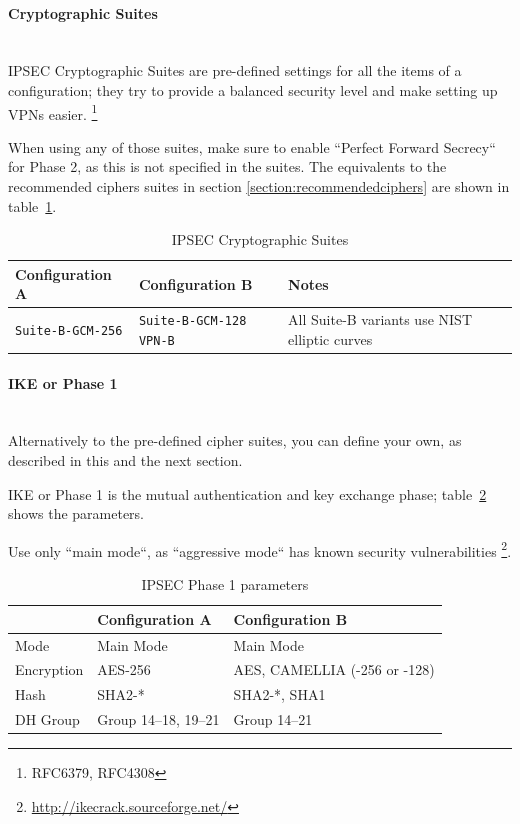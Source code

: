 \begin{description}
\paragraph*{Cryptographic Suites}\mbox{}\\

IPSEC Cryptographic Suites are pre-defined settings for all the items
of a configuration; they try to provide a balanced security level and
make setting up VPNs easier.
\footnote{RFC6379\cite{rfc6379}, RFC4308\cite{rfc4308}}

When using any of those suites, make sure to enable ``Perfect Forward
Secrecy`` for Phase 2, as this is not specified in the suites. The
equivalents to the recommended ciphers suites in section
\ref{section:recommendedciphers} are shown in
table~\ref{tab:IPSEC_suites}.

\begin{table}[h]
  \centering
  \small
  \begin{tabular}{p{2.5cm}p{2.5cm}l}
    \toprule
    Configuration A & Configuration B & Notes\\
    \midrule
    \verb|Suite-B-GCM-256| &
    \verb|Suite-B-GCM-128| \newline
    \verb|VPN-B| 
    & All Suite-B variants use NIST elliptic curves\\
    \bottomrule
  \end{tabular}
  \caption{IPSEC Cryptographic Suites}
  \label{tab:IPSEC_suites}
\end{table}

\paragraph*{IKE or Phase 1}\mbox{}\\

Alternatively to the pre-defined cipher suites, you can define your
own, as described in this and the next section.

IKE or Phase 1 is the mutual authentication and key exchange phase;
table~\ref{tab:IPSEC_ph1_params} shows the parameters.

Use only ``main mode``, as ``aggressive mode`` has known security
vulnerabilities \footnote{\url{http://ikecrack.sourceforge.net/}}.

\begin{table}[h]
  \centering
  \small
  \begin{tabular}{lll}
    \toprule
    & Configuration A & Configuration B \\
    \midrule
    Mode & Main Mode & Main Mode \\
    Encryption & AES-256 & AES, CAMELLIA (-256 or -128) \\
    Hash & SHA2-* & SHA2-*, SHA1 \\
    DH Group & Group 14--18, 19--21 & Group 14--21 \\
    \bottomrule
  \end{tabular}
  \caption{IPSEC Phase 1 parameters}
  \label{tab:IPSEC_ph1_params}
\end{table}


\end{description}

